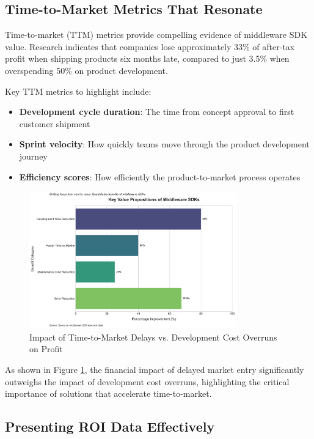 \documentclass[11pt,a4paper]{article}
\begin{document}
\subsection{Time-to-Market Metrics That Resonate}

Time-to-market (TTM) metrics provide compelling evidence of middleware SDK value. Research indicates that companies lose approximately 33\% of after-tax profit when shipping products six months late, compared to just 3.5\% when overspending 50\% on product development.

Key TTM metrics to highlight include:

\begin{itemize}
    \item \textbf{Development cycle duration}: The time from concept approval to first customer shipment
    \item \textbf{Sprint velocity}: How quickly teams move through the product development journey
    \item \textbf{Efficiency scores}: How efficiently the product-to-market process operates
\end{itemize}

\begin{figure}[htbp]
    \centering
    \includegraphics[width=0.8\textwidth]{figures/visualization-20250509144521.png}
    \caption{Impact of Time-to-Market Delays vs. Development Cost Overruns on Profit}
    \label{fig:ttm-impact}
\end{figure}

As shown in Figure \ref{fig:ttm-impact}, the financial impact of delayed market entry significantly outweighs the impact of development cost overruns, highlighting the critical importance of solutions that accelerate time-to-market.

\subsection{Presenting ROI Data Effectively}
\end{document}
